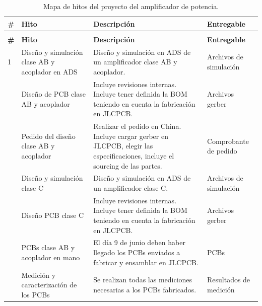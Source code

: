 \begin{xltabular}{\textwidth}{>{\centering\arraybackslash}p{0.4cm} X X p{2.5cm}}
    \caption{Mapa de hitos del proyecto del amplificador de potencia.} \label{tab:mapa_hitos} \\
    \hline\hline
    \textbf{\#} & \textbf{Hito} & \textbf{Descripción} & \textbf{Entregable} \\
    \hline
    \endfirsthead

     \\
    \hline
    \textbf{\#} & \textbf{Hito} & \textbf{Descripción} & \textbf{Entregable} \\
    \hline
    \endhead

    \hline
    \endfoot

    \hline
    \endlastfoot

    1 & Diseño y simulación clase AB y acoplador en ADS & Diseño y simulación en ADS de un amplificador clase AB y acoplador. & Archivos de simulación \\
    
     & Diseño de PCB clase AB y acoplador & Incluye revisiones internas. Incluye tener definida la BOM teniendo en cuenta la fabricación en JLCPCB. & Archivos gerber \\
    
     & Pedido del diseño clase AB y acoplador & Realizar el pedido en China. Incluye cargar gerber en JLCPCB, elegir las especificaciones, incluye el sourcing de las partes. & Comprobante de pedido \\
    
     & Diseño y simulación clase C & Diseño y simulación en ADS de un amplificador clase C. & Archivos de simulación \\
    
     & Diseño PCB clase C & Incluye revisiones internas. Incluye tener definida la BOM teniendo en cuenta la fabricación en JLCPCB. & Archivos gerber \\
    
     & PCBs clase AB y acoplador en mano & El día 9 de junio deben haber llegado los PCBs enviados a fabricar y ensamblar en JLCPCB. & PCBs \\
    
     & Medición y caracterización de los PCBs & Se realizan todas las mediciones necesarias a los PCBs fabricados. & Resultados de medición \\
    

\end{xltabular}
